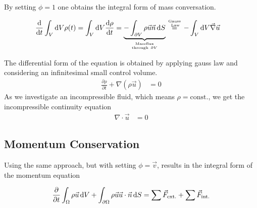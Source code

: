 By setting $\phi = 1$ one obtains the integral form of mass conversation.

\begin{align}
    \frac{\dif}{\dif t} \int_{V}\dif V \rho(t) =  \int_{V}\dif V \frac{\dif \rho}{\dif t}  &= \underbrace{-\int_{\partial V}
     \rho \vec{u}\vec{n}\dif S}_{\mathrm{Massflux} \atop \mathrm{through \ } \partial V} \stackrel{\text{Gauss} \atop \text{ Law}}{=} -\int_V \dif V \vec{\nabla}\vec{u}
\end{align}

The differential form of the equation is obtained by applying gauss law and considering an infinitesimal small control volume.
\begin{align}
     \frac{\partial \rho}{\partial t}  + \nabla \left(\rho \vec{u}\right) &= 0
\end{align}
As we investigate an incompressible fluid, which means $\rho = \text{const.}$, we get the incompressible continuity equation
\begin{align}
     \nabla \cdot \vec{u} &= 0
\end{align}

\subsection{Momentum Conservation}

Using the same approach, but with setting $\phi = \vec{v}$, results in the integral form of the momentum equation

\begin{align}
    \label{theorie:intimpulse}
    \pdn[]{t} \int_\Omega \rho \vec{u}\dif V + \int_{\partial\Omega} \rho\vec{u}\vec{u}\cdot \vec{n} \dif S =  \sum \vec{F}_{\text{ext.}} + \sum \vec{F}_{\text{int.}}
\end{align}

